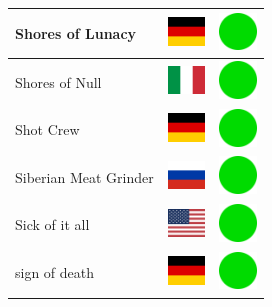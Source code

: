 \documentclass[12pt, a4paper, twoside]{report}
\begin{document}
\begin{center}
\begin{longtable}{|p{5cm}|p{2cm}|p{2cm}|}
 Shores of Lunacy                                           & \includegraphics[width=1cm]{4x3/de} &   \includegraphics[width=1cm]{likes/y} \\ \hline
 Shores of Null                                             & \includegraphics[width=1cm]{4x3/it} &   \includegraphics[width=1cm]{likes/y} \\ \hline
 Shot Crew                                                  & \includegraphics[width=1cm]{4x3/de} &   \includegraphics[width=1cm]{likes/y} \\ \hline
 Siberian Meat Grinder                                      & \includegraphics[width=1cm]{4x3/ru} &   \includegraphics[width=1cm]{likes/y} \\ \hline
 Sick of it all                                             & \includegraphics[width=1cm]{4x3/us} &   \includegraphics[width=1cm]{likes/y} \\ \hline
 sign of death                                              & \includegraphics[width=1cm]{4x3/de} &   \includegraphics[width=1cm]{likes/y} \\ \hline

\end{longtable}
\end{center}
\end{document}
